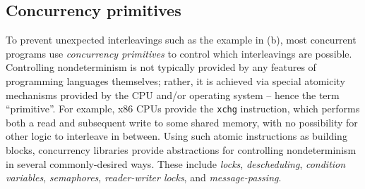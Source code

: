 \subsection{Concurrency primitives}
\label{sec:overview-mutex}

To prevent unexpected interleavings such as the example in (b),
most concurrent programs use {\em concurrency primitives} to control which interleavings are possible.
Controlling nondeterminism is not typically provided by any features of programming languages themselves;
rather, it is achieved via special atomicity mechanisms provided by the CPU and/or operating system -- hence the term ``primitive''.
For example, x86 CPUs provide the {\tt xchg} instruction, which performs both a read and subsequent write to some shared memory, with no possibility for other logic to interleave in between.
Using such atomic instructions as building blocks, concurrency libraries provide abstractions for controlling nondeterminism in several commonly-desired ways.
These include {\em locks}, {\em descheduling}, {\em condition variables}, {\em semaphores}, {\em reader-writer locks}, and {\em message-passing}.

